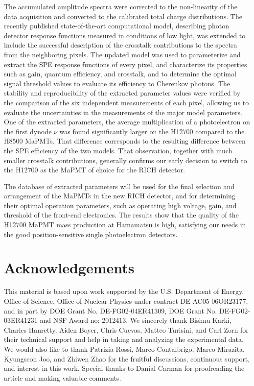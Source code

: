 The accumulated amplitude spectra were corrected to the non-linearity of the data acquisition and converted to the calibrated total charge distributions. The recently published state-of-the-art computational model, describing photon detector response functions measured in conditions of low light, was extended to include the successful description of the crosstalk contributions to the spectra from the neighboring pixels. The updated model was used to parameterize and extract the SPE response functions of every pixel, and characterize its properties such as gain, quantum efficiency, and crosstalk, and to determine the optimal signal threshold values to evaluate its efficiency to Cherenkov photons. The stability and reproducibility of the extracted parameter values were verified by the comparison of the six independent measurements of each pixel, allowing us to evaluate the uncertainties in the measurements of the major model parameters. One of the extracted parameters, the average multiplication of a photoelectron on the first dynode $\nu$ was found significantly larger on the H12700 compared to the H8500 MaPMTs. That difference corresponds to the resulting difference between the SPE efficiency of the two models.  That observation, together with much smaller crosstalk contributions, generally confirms our early decision to switch to the H12700 as the MaPMT of choice for the RICH detector.

The database of extracted parameters will be used for the final selection and arrangement of the MaPMTs in the new RICH detector, and for determining their optimal operation parameters, such as operating high voltage, gain, and threshold of the front-end electronics. The results show that the quality of the H12700 MaPMT mass production at Hamamatsu is high, satisfying our needs in the good position-sensitive single photoelectron detectors.



\section{Acknowledgements}
This material is based upon work supported by the U.S. Department of Energy, Office of Science, Office of Nuclear Physics under contract DE-AC05-06OR23177, and in part by DOE Grant No. DE-FG02-04ER41309, DOE Grant No. DE-FG02-03ER41231 and NSF Award no: 2012413. 
We sincerely thank 
Bishnu Karki,
Charles Hanretty,
Aiden Boyer,
Chris  Cuevas,
Matteo Turisini, and
Carl Zorn
for their technical support and help in taking and analyzing the experimental data. We would
also like to thank 
Patrizia Rossi, 
Marco Contalbrigo, 
Marco Mirazita,
Kyungseon Joo,
and Zhiwen Zhao
for the fruitful discussions, continuous support, and interest in this work. Special thanks to Danial Carman for proofreading the article and making valuable comments.
